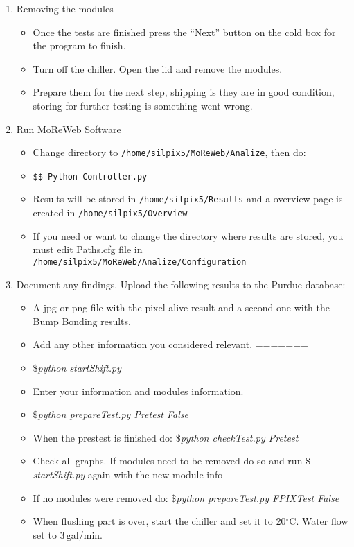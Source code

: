 \documentclass[12pt]{unlsilabsop}
\begin{document}
\begin{enumerate}
   \item Removing the modules
   \begin{itemize}
   		\item Once the tests are finished press the ``Next'' button on the cold box for the program to finish.
   		\item Turn off the chiller. Open the lid and remove the modules.
   		\item Prepare them for the next step, shipping is they are in good condition, storing for further testing is something went wrong.
	\end{itemize} 
	 \item Run MoReWeb Software
    \begin{itemize}
    		\item Change directory to \texttt{/home/silpix5/MoReWeb/Analize}, then do:
    		\item \texttt{\$\$ Python Controller.py}
    		\item Results will be stored in \texttt{/home/silpix5/Results} and a overview page is created in \texttt{/home/silpix5/Overview}
    		\item If you need or want to change the directory where results are stored, you must edit Paths.cfg file in \texttt{/home/silpix5/MoReWeb/Analize/Configuration}
   \end{itemize}  	
    \item Document any findings. Upload the following results to the Purdue database:
    \begin{itemize}
    		\item A jpg or png file with the pixel alive result and a second one with the Bump Bonding results.
    		\item Add any other information you considered relevant.
=======
    		\item {$\$ $\it{python startShift.py}}
    		\item Enter your information and modules information.
    		\item {$\$ $\it{python prepareTest.py Pretest False}}
    		\item When the prestest is finished do: {$\$ $\it{python checkTest.py Pretest}}
    		\item Check all graphs. If modules need to be removed do so and run {$\$ $\it{startShift.py}} again with the new module info
    		\item If no modules were removed do: {$\$ $\it{python prepareTest.py FPIXTest False}}
    		\item When flushing part is over, start the chiller and set it to 20$^\circ$C. Water flow set to 3\,gal/min.

\end{itemize}
\end{enumerate}
\end{document}
